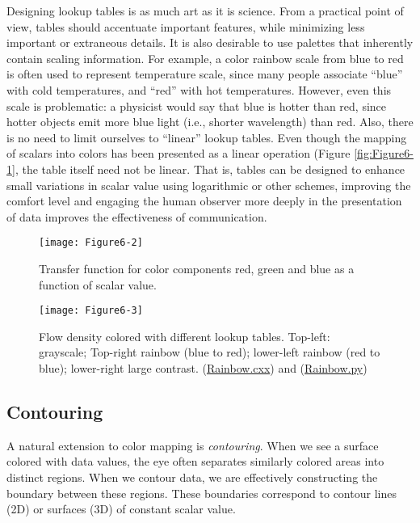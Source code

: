 Designing lookup tables is as much art as it is science. From a practical point of view, tables should accentuate important features, while minimizing less important or extraneous details. It is also desirable to use palettes that inherently contain scaling information. For example, a color rainbow scale from blue to red is often used to represent temperature scale, since many people associate ``blue'' with cold temperatures, and ``red'' with hot temperatures. However, even this scale is problematic: a physicist would say that blue is hotter than red, since hotter objects emit more blue light (i.e., shorter wavelength) than red. Also, there is no need to limit ourselves to ``linear'' lookup tables. Even though the mapping of scalars into colors has been presented as a linear operation (Figure \ref{fig:Figure6-1}, the table itself need not be linear. That is, tables can be designed to enhance small variations in scalar value using logarithmic or other schemes, improving the comfort level and engaging the human observer more deeply in the presentation of data improves the effectiveness of communication.

\begin{figure}[!htb]
	\centering
	\texttt{[image: Figure6-2]}
	\caption{Transfer function for color components red, green and blue as a function of scalar value.}
	\label{fig:Figure6-2}
\end{figure}

\begin{figure}[!htb]
	\centering
	\texttt{[image: Figure6-3]}
	\caption{Flow density colored with different lookup tables. Top-left: grayscale; Top-right rainbow (blue to red); lower-left rainbow (red to blue); lower-right large contrast. (\href{https://lorensen.github.io/VTKExamples/site/Cxx/Rendering/Rainbow/}{Rainbow.cxx}) and (\href{https://lorensen.github.io/VTKExamples/site/Python/Rendering/Rainbow/}{Rainbow.py})}
	\label{fig:Figure6-3}
\end{figure}

\subsection{Contouring}
\label{subsec:contouring}

A natural extension to color mapping is \emph{contouring}. When we see a surface colored with data values, the eye often separates similarly colored areas into distinct regions. When we contour data, we are effectively constructing the boundary between these regions. These boundaries correspond to contour lines (2D) or surfaces (3D) of constant scalar value.

